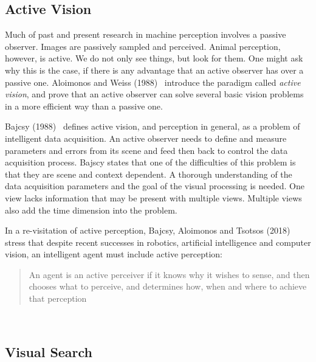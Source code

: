 \subsection{Active Vision}
\label{sec:activevision}


Much of past and present research in machine perception involves a passive observer.
Images are passively sampled and perceived.
Animal perception, however, is active.
We do not only see things, but look for them.
One might ask why this is the case, if there is any advantage that an active observer has over a passive one.
Aloimonos and Weiss (1988)~\cite{aloimonos_active_1988} introduce the paradigm called \textit{active vision}, and prove that an active observer can solve several basic vision problems in a more efficient way than a passive one.

Bajcsy (1988)~\cite{bajcsy_1988} defines active vision, and perception in general, as a problem of intelligent data acquisition.
An active observer needs to define and measure parameters and errors from its scene and feed then back to control the data acquisition process.
Bajscy states that one of the difficulties of this problem is that they are scene and context dependent.
A thorough understanding of the data acquisition parameters and the goal of the visual processing is needed.
One view lacks information that may be present with multiple views.
Multiple views also add the time dimension into the problem.

In a re-visitation of active perception, Bajcsy, Aloimonos and Tsotsos (2018)~\cite{bajcsy_aloimonos_tsotsos_2018} stress that despite recent successes in robotics, artificial intelligence and computer vision, an intelligent agent must include active perception:

\begin{quote}
    An agent is an active perceiver if it knows why it wishes to sense, and then chooses what to perceive, and determines how, when and where to achieve that perception
\end{quote}~\cite{bajcsy_aloimonos_tsotsos_2018}


\subsection{Visual Search}
\label{sec:visualsearch}

